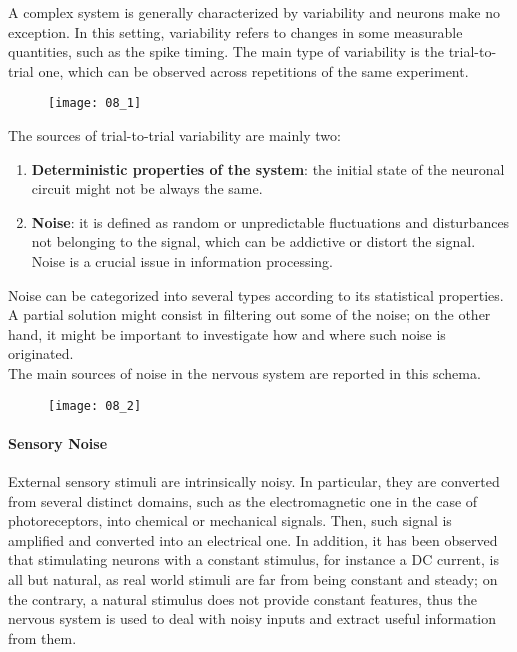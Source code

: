 A complex system is generally characterized by variability and neurons make no
exception. In this setting, variability refers to changes in some measurable quantities,
such as the spike timing. The main type of variability is the trial-to-trial one, which
can be observed across repetitions of the same experiment.
\begin{figure}[H]
    \texttt{[image: 08\_1]}
    \centering
\end{figure}
The sources of trial-to-trial variability are mainly two:
\begin{enumerate}
    \item \textbf{Deterministic properties of the system}: the initial state of the
          neuronal circuit might not be always the same.
    \item \textbf{Noise}: it is defined as random or unpredictable fluctuations
          and disturbances not belonging to the signal, which can be addictive or distort
          the signal. Noise is a crucial issue in information processing.
\end{enumerate}
Noise can be categorized into several types according to its statistical properties.
A partial solution might consist in filtering out some of the noise; on the other hand,
it might be important to investigate how and where such noise is originated.\\
The main sources of noise in the nervous system are reported in this schema.
\begin{figure}[H]
    \texttt{[image: 08\_2]}
    \centering
\end{figure}
\paragraph{Sensory Noise} External sensory stimuli are intrinsically noisy. In particular,
they are converted from several distinct domains, such as the electromagnetic one in the
case of photoreceptors, into chemical or mechanical signals. Then, such signal is amplified
and converted into an electrical one. In addition, it has been observed that stimulating
neurons with a constant stimulus, for instance a DC current, is all but natural, as real world
stimuli are far from being constant and steady; on the contrary, a natural stimulus does not
provide constant features, thus the nervous system is used to deal with noisy inputs and
extract useful information from them.

